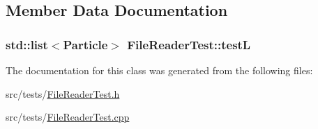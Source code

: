 \subsection{Member Data Documentation}
\hypertarget{classFileReaderTest_a9392293a0d47f08bee440ea1b4c5925a}{
\subsubsection[{test\-L}]{\setlength{\rightskip}{0pt plus 5cm}std\-::list$<${\bf Particle}$>$ File\-Reader\-Test\-::test\-L\hspace{0.3cm}{\ttfamily [private]}}}\label{classFileReaderTest_a9392293a0d47f08bee440ea1b4c5925a}


The documentation for this class was generated from the following files\-:\begin{DoxyCompactItemize}
\item 
src/tests/\hyperlink{FileReaderTest_8h}{File\-Reader\-Test.\-h}\item 
src/tests/\hyperlink{FileReaderTest_8cpp}{File\-Reader\-Test.\-cpp}\end{DoxyCompactItemize}
